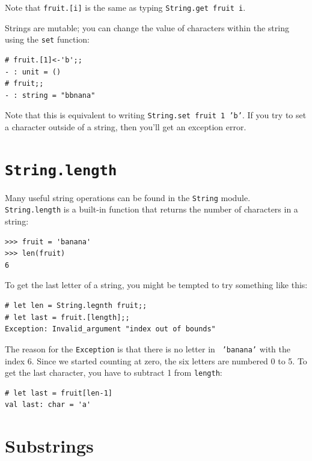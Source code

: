 \documentclass[10pt]{book}
\begin{document}
Note that {\tt fruit.[i]} is the same as typing {\tt String.get fruit i}.

Strings are mutable; you can change the value of characters within the 
string using the {\tt set} function:

\beforeverb
\begin{verbatim}
# fruit.[1]<-'b';;
- : unit = ()
# fruit;;
- : string = "bbnana"
\end{verbatim}
\afterverb

Note that this is equivalent to writing {\tt String.set fruit 1 'b'}. If you 
try to set a character outside of a string, then you'll get an exception error.

\section{{\tt String.length}}


Many useful string operations can be found in the {\tt String} module.
{\tt String.length} is a built-in function that returns the number of 
characters in a string:

\beforeverb
\begin{verbatim}
>>> fruit = 'banana'
>>> len(fruit)
6
\end{verbatim}
\afterverb
%
To get the last letter of a string, you might be tempted to try something
like this:


\beforeverb
\begin{verbatim}
# let len = String.legnth fruit;;
# let last = fruit.[length];;
Exception: Invalid_argument "index out of bounds"
\end{verbatim}
\afterverb
%
The reason for the {\tt Exception} is that there is no letter in {\tt
'banana'} with the index 6.  Since we started counting at zero, the
six letters are numbered 0 to 5.  To get the last character, you have
to subtract 1 from {\tt length}:

\beforeverb
\begin{verbatim}
# let last = fruit[len-1]
val last: char = 'a'
\end{verbatim}
\afterverb
%

\section{Substrings}
\end{document}
